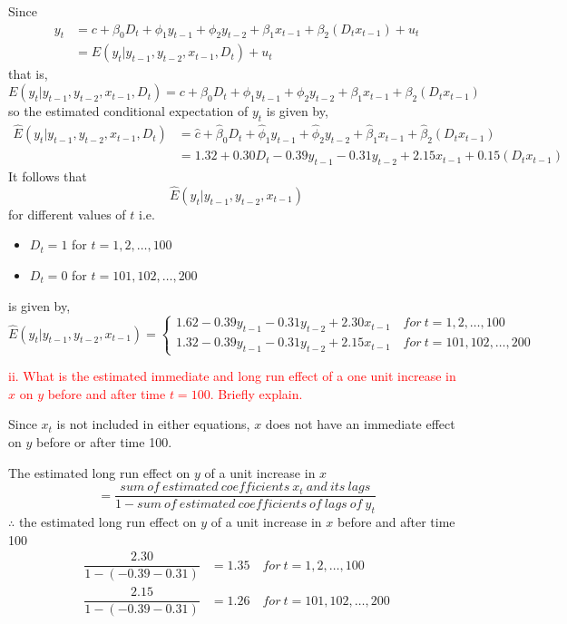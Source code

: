 \documentclass[12pt]{report}
\begin{document}
\noindent Since \begin{align*}
 y_t &= c + \beta_0D_t + \phi_1y_{t-1} + \phi_2y_{t-2} + \beta_1x_{t-1} + \beta_2(D_tx_{t-1}) + u_t \\
 &= {E}(y_t|y_{t-1}, y_{t-2}, x_{t-1}, D_t) + u_t 
\end{align*} \noindent that is, $${E}(y_t|y_{t-1}, y_{t-2}, x_{t-1}, D_t) = c + \beta_0D_t + \phi_1y_{t-1} + \phi_2y_{t-2} + \beta_1x_{t-1} + \beta_2(D_tx_{t-1})$$ so the estimated conditional expectation of $y_t$ is given by,
\begin{align*}
	\hat{E}(y_t|y_{t-1}, y_{t-2}, x_{t-1}, D_t) &= \hat{c} + \hat{\beta}_0D_t + \hat{\phi}_1y_{t-1} + \hat{\phi}_2y_{t-2} + \hat{\beta}_1x_{t-1} + \hat{\beta}_2(D_tx_{t-1}) \\
	&= 1.32 + 0.30D_t - 0.39y_{t-1} - 0.31y_{t-2} + 2.15x_{t-1} + 0.15(D_tx_{t-1})
\end{align*} It follows that 
$$\hat{E}(y_t|y_{t-1}, y_{t-2}, x_{t-1})$$ for different values of $t$ i.e.\vspace{-\baselineskip} \begin{itemize}
	\item $D_t = 1$ for $t=1,2,\dots,100$  
	\item $D_t = 0$ for $t=101,102,\dots,200$ 
\end{itemize} \vspace{-\baselineskip} is given by, 
\begin{equation*}
\hat{E}(y_t|y_{t-1}, y_{t-2}, x_{t-1}) = \begin{cases}
1.62 - 0.39y_{t-1} - 0.31y_{t-2} + 2.30x_{t-1} \quad for\ t=1,2,\dots,100 \\
1.32 - 0.39y_{t-1} - 0.31y_{t-2} + 2.15x_{t-1} \quad for\ t=101,102,\dots,200
\end{cases}
\end{equation*}

\noindent \textcolor{red}{ii. What is the estimated immediate and long run effect of a one unit increase in $x$ on $y$ before and after time $t=100$. Briefly explain.}

\noindent Since $x_t$ is not included in either equations, $x$ does not have an immediate effect on $y$ before or after time 100. 

\noindent The estimated long run effect on $y$ of a unit increase in $x$ $$= \dfrac{sum\ of\ estimated\ coefficients\ x_t\ and\ its\ lags}{1 - sum\ of\ estimated\ coefficients\ of\ lags\ of\ y_t}$$ $\therefore$ the estimated long run effect on $y$ of a unit increase in $x$ before and after time 100 \begin{align*}
	\dfrac{2.30}{1 - (-0.39 - 0.31)} & = 1.35 \quad for\ t=1,2,\dots,100 \\
	\dfrac{2.15}{1 - (-0.39 - 0.31)} & = 1.26 \quad for\ t=101,102,\dots,200
\end{align*}
\end{document}
